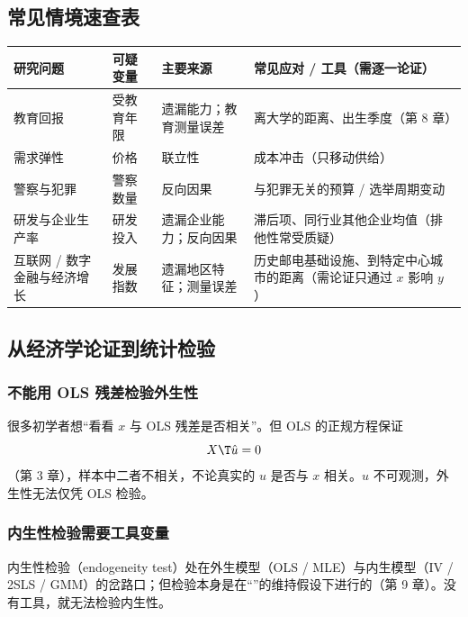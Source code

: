 \subsection{常见情境速查表}

\begin{center}
\small
\begin{tabularx}{\linewidth}{>{\raggedright\arraybackslash}p{2.6cm}>{\raggedright\arraybackslash}p{1.9cm}>{\raggedright\arraybackslash}p{3.0cm}L}
\toprule
研究问题 & 可疑变量 & 主要来源 & 常见应对 / 工具（需逐一论证）\\
\midrule
教育回报 & 受教育年限 & 遗漏能力；教育测量误差 & 离大学的距离、出生季度（第 8 章）\\
需求弹性 & 价格 & 联立性 & 成本冲击（只移动供给）\\
警察与犯罪 & 警察数量 & 反向因果 & 与犯罪无关的预算 / 选举周期变动\\
研发与企业生产率 & 研发投入 & 遗漏企业能力；反向因果 & 滞后项、同行业其他企业均值（排他性常受质疑）\\
互联网 / 数字金融与经济增长 & 发展指数 & 遗漏地区特征；测量误差 & 历史邮电基础设施、到特定中心城市的距离（需论证只通过 $x$ 影响 $y$）\\
\bottomrule
\end{tabularx}
\end{center}

\subsection{从经济学论证到统计检验}

\subsubsection{不能用 OLS 残差检验外生性}

很多初学者想“看看 $x$ 与 OLS 残差是否相关”。但 OLS 的正规方程保证
\[
X\T\hat u=0
\]
（第 3 章），样本中二者不相关，不论真实的 $u$ 是否与 $x$ 相关。$u$ 不可观测，外生性无法仅凭 OLS 检验。

\subsubsection{内生性检验需要工具变量}

内生性检验（endogeneity test）处在外生模型（OLS / MLE）与内生模型（IV / 2SLS / GMM）的岔路口；但检验本身是在“”的维持假设下进行的（第 9 章）。没有工具，就无法检验内生性。

